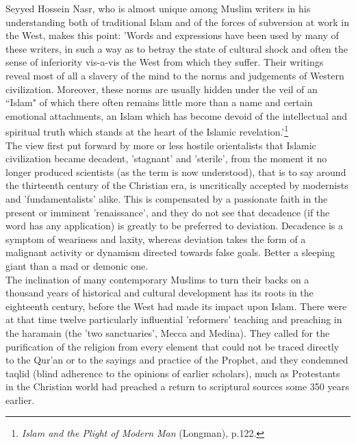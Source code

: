 \documentclass[10pt, twoside,openright]{book}
\begin{document}
Seyyed Hossein Nasr, who is almost unique among Muslim writers in his understanding both of traditional Islam and of the forces of subversion at work in the West, makes this point: 'Words and expressions have been used by many of these writers, in such a way as to betray the state of cultural shock and often the sense of inferiority vis\hyp{}a\hyp{}vis the West from which they suffer. Their writings reveal most of all a slavery of the mind to the norms and judgements of Western civilization. Moreover, these norms are usually hidden under the veil of an ``Islam" of which there often remains little more than a name and certain emotional attachments, an Islam which has become devoid of the intellectual and spiritual truth which stands at the heart of the Islamic revelation.'\footnote{\emph{Islam and the Plight of Modern Man} (Longman), p.122.}\\


The view first put forward by more or less hostile orientalists that Islamic civilization became decadent, 'stagnant' and 'sterile', from the moment it no longer produced scientists (as the term is now understood), that is to say around the thirteenth century of the Christian era, is uncritically accepted by modernists and 'fundamentalists' alike. This is compensated by a passionate faith in the present or imminent 'renaissance', and they do not see that decadence (if the word has any application) is greatly to be preferred to deviation. Decadence is a symptom of weariness and laxity, whereas deviation takes the form of a malignant activity or dynamism directed towards false goals. Better a sleeping giant than a mad or demonic one. \\

The inclination of many contemporary Muslims to turn their backs on a thousand years of historical and cultural development has its roots in the eighteenth century, before the West had made its impact upon Islam. There were at that time twelve particularly influential 'reformers' teaching and preaching in the haramain (the 'two sanctuaries', Mecca and Medina). They called for the purification of the religion from every element that could not be traced directly to the Qur'an or to the sayings and practice of the Prophet, and they condemned taqlid (blind adherence to the opinions of earlier scholars), much as Protestants in the Christian world had preached a return to scriptural sources some 350 years earlier. \\
\end{document}
